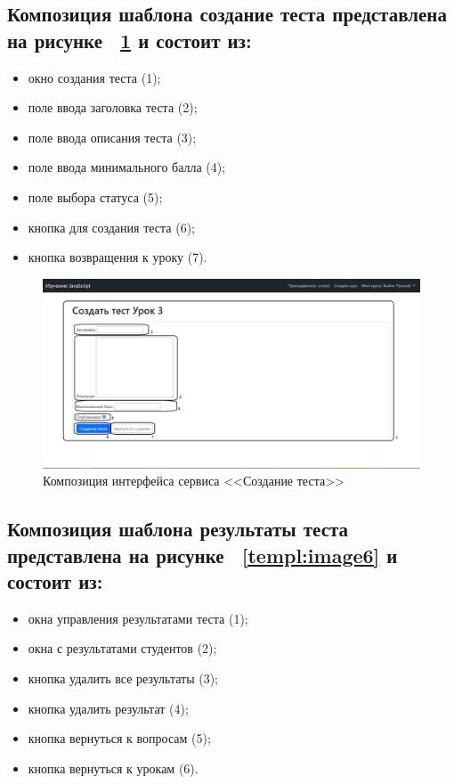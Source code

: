 \subsection*{Композиция шаблона создание теста представлена на рисунке ~\ref{templ:image5} и состоит из:}

\begin{itemize}
	\item окно создания теста (1);
	\item поле ввода заголовка теста (2);
	\item поле ввода описания теста (3);
	\item поле ввода минимального балла (4);
	\item поле выбора статуса (5);
	\item кнопка для создания теста (6);
	\item кнопка возвращения к уроку (7).
\end{itemize}

\begin{figure}[htp!]
	\centering
	\includegraphics[width=0.8\linewidth]{images/создатьтест}
	\caption{Композиция интерфейса сервиса <<Создание теста>>}
	\label{templ:image5}
\end{figure}
\newpage
\subsection*{Композиция шаблона результаты теста представлена на рисунке ~\ref{templ:image6} и состоит из:}

\begin{itemize}
	\item окна управления результатами теста (1);
	\item окна с результатами студентов  (2);
	\item кнопка удалить все результаты (3);
	\item кнопка удалить результат (4);
	\item кнопка вернуться к вопросам (5);
	\item кнопка вернуться к урокам (6).
\end{itemize}


